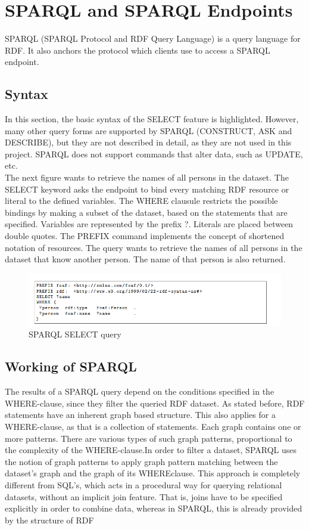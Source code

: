 \documentclass[a4paper,12pt,oneside]{report}
\begin{document}
{{{\section{SPARQL and SPARQL Endpoints}
SPARQL (SPARQL Protocol and RDF Query Language) is a query language for RDF. It also anchors the protocol which clients use to access a SPARQL endpoint.
\subsection{Syntax}
{In this section, the basic syntax of the SELECT feature is highlighted. However, many other
query forms are supported by SPARQL (CONSTRUCT, ASK and DESCRIBE), but they are not described in detail, as they are not used in this project. SPARQL does not support commands that alter data, such as UPDATE, etc.\\
The next figure wants to retrieve the names of all persons in the dataset. The SELECT keyword asks the endpoint to bind every matching RDF resource or literal to the defined variables.
The WHERE clausule restricts the possible bindings by making a subset of the dataset, based on the statements that are specified. Variables are represented by the prefix ?. Literals are placed between double quotes. The PREFIX command implements the concept of shortened
notation of resources. The query wants to retrieve the names of all persons in the dataset that know another person. The name of that person is also returned.}
\begin{figure}[ht]
\centering
\includegraphics[width=1\textwidth]{Capture5}
\caption{SPARQL SELECT query}
\end{figure}
\subsection{Working of SPARQL}
{The results of a SPARQL query depend on the conditions specified in the WHERE-clause, since they filter the queried RDF dataset. As stated before, RDF statements have an inherent graph based structure. This also applies for a WHERE-clause, as that is a collection of statements. Each graph contains one or more patterns. There are various types of such graph patterns, proportional to the complexity of the WHERE-clause.In order to filter a dataset, SPARQL uses the notion of graph patterns
to apply graph pattern matching between the dataset’s graph and the graph of its WHEREclause. This approach is completely different from SQL’s, which acts in a procedural way for querying relational datasets, without an implicit join feature. That is, joins have to be
specified explicitly in order to combine data, whereas in SPARQL, this is already provided by the structure of RDF}
}}}
\end{document}
